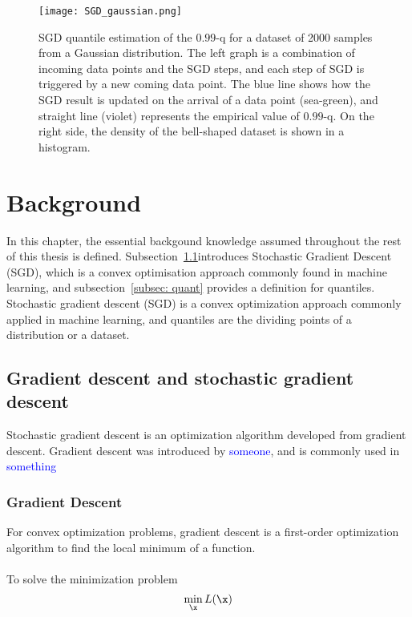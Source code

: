 \begin{figure*}[h!]
	\texttt{[image: SGD\_gaussian.png]}
    \caption{SGD quantile estimation of the $0.99$-q for a dataset of 2000 samples from a Gaussian distribution. The left graph is a combination of incoming data points and the SGD steps, and each step of SGD is triggered by a new coming data point. The blue line shows how the SGD result is updated on the arrival of a data point (sea-green), and straight line (violet) represents the empirical value of $0.99$-q. On the right side, the density of the bell-shaped dataset is shown in a histogram.}
    \label{fig: SGD_quant}
\end{figure*}


\section{Background}

In this chapter, the essential backgound knowledge assumed throughout the rest of this thesis is defined. Subsection~\ref{subsec: sgd}introduces Stochastic Gradient Descent (SGD), which is a convex optimisation approach commonly found in machine learning, and subsection~\ref{subsec: quant} provides a definition for quantiles.
Stochastic gradient descent (SGD) is a convex optimization approach commonly applied in machine learning, and quantiles are the dividing points of a distribution or a dataset.

    \subsection{Gradient descent and stochastic gradient descent}
    \label{subsec: sgd}
    Stochastic gradient descent is an optimization algorithm developed from gradient descent. 
    Gradient descent was introduced by \textcolor{blue}{someone}, and is commonly used in \textcolor{blue}{something}

    \subsubsection{Gradient Descent}
        For convex optimization problems, gradient descent is a first-order optimization algorithm 
        to find the local minimum of a function.
        \\\\
        To solve the minimization problem 
        \begin{equation}
            \min_{\x} L(\x) 
        \end{equation} 
        
